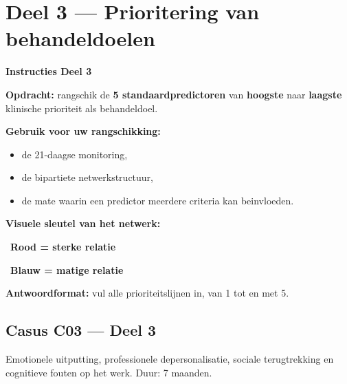 \documentclass[11pt,a4paper]{article}
\begin{document}
\vspace{0.6em}
\newpage


\section{Deel 3 --- Prioritering van behandeldoelen}

\begin{tcolorbox}[colback=yellow!5,colframe=GoldAmber,arc=2.5mm,boxrule=0.9pt,
  left=10pt,right=10pt,top=9pt,bottom=9pt]
\textbf{\color{GoldAmber}Instructies Deel 3}

\smallskip\small
\textbf{Opdracht:} rangschik de \textbf{5 standaardpredictoren} van \textbf{hoogste} naar \textbf{laagste}
klinische prioriteit als behandeldoel.

\textbf{Gebruik voor uw rangschikking:}
\begin{itemize}[topsep=2pt,itemsep=1pt]
\item de 21-daagse monitoring,
\item de bipartiete netwerkstructuur,
\item de mate waarin een predictor meerdere criteria kan beinvloeden.
\end{itemize}

\textbf{Visuele sleutel van het netwerk:}
\begin{center}
~\textbf{Rood = sterke relatie}\qquad
{}~\textbf{Blauw = matige relatie}
\end{center}

\textbf{Antwoordformat:} vul alle prioriteitslijnen in, van 1 tot en met 5.
\end{tcolorbox}

\vspace{0.5em}
\subsection*{Casus C03 --- Deel 3}

\begin{complaintbox}[title={Casus C03 --- 41-jarige leraar secundair onderwijs}]
\small Emotionele uitputting, professionele depersonalisatie, sociale terugtrekking en cognitieve fouten op het werk. Duur: 7 maanden.
\end{complaintbox}
\end{document}
